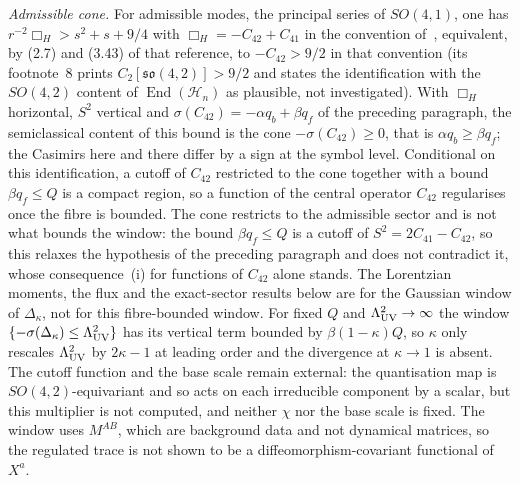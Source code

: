 \emph{Admissible cone.} For admissible modes, the principal series of \(SO(4,1)\), one has \(r^{-2}\Box_H>s^2+s+9/4\) with \(\Box_H=-C_{42}+C_{41}\) in the convention of~\cite{Steinacker2019NoGhost}, equivalent, by (2.7) and (3.43) of that reference, to \(-C_{42}>9/2\) in that convention (its footnote~8 prints \(C_2[\mathfrak{so}(4,2)]>9/2\) and states the identification with the \(SO(4,2)\) content of \(\operatorname{End}(\mathcal H_n)\) as plausible, not investigated). With \(\Box_H\) horizontal, \(S^2\) vertical and \(\sigma(C_{42})=-\alpha q_b+\beta q_f\) of the preceding paragraph, the semiclassical content of this bound is the cone \(-\sigma(C_{42})\ge0\), that is \(\alpha q_b\ge\beta q_f\); the Casimirs here and there differ by a sign at the symbol level. Conditional on this identification, a cutoff of \(C_{42}\) restricted to the cone together with a bound \(\beta q_f\le Q\) is a compact region, so a function of the central operator \(C_{42}\) regularises once the fibre is bounded. The cone restricts to the admissible sector and is not what bounds the window: the bound \(\beta q_f\le Q\) is a cutoff of \(S^2=2C_{41}-C_{42}\), so this relaxes the hypothesis of the preceding paragraph and does not contradict it, whose consequence~(i) for functions of \(C_{42}\) alone stands. The Lorentzian moments, the flux and the exact-sector results below are for the Gaussian window of \(\Delta_\kappa\), not for this fibre-bounded window. For fixed \(Q\) and \(\Lambda_{\mathrm{UV}}^2\to\infty\) the window \(\{-\sigma(\Delta_\kappa)\le\Lambda_{\mathrm{UV}}^2\}\) has its vertical term bounded by \(\beta(1-\kappa)Q\), so \(\kappa\) only rescales \(\Lambda_{\mathrm{UV}}^2\) by \(2\kappa-1\) at leading order and the divergence at \(\kappa\to1\) is absent. The cutoff function and the base scale remain external: the quantisation map is \(SO(4,2)\)-equivariant and so acts on each irreducible component by a scalar, but this multiplier is not computed, and neither \(\chi\) nor the base scale is fixed. The window uses \(M^{AB}\), which are background data and not dynamical matrices, so the regulated trace is not shown to be a diffeomorphism-covariant functional of \(X^a\).

